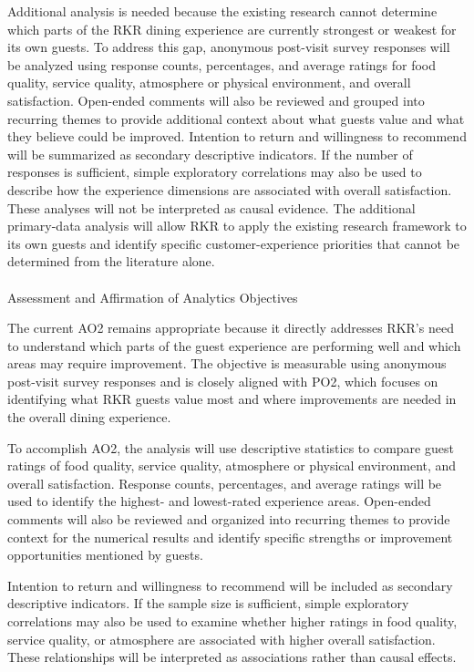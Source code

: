 \documentclass[
  12pt,
  letterpaper,
  DIV=11,
  numbers=noendperiod]{scrartcl}
\makeatletter
\let\oldparagraph\paragraph
\renewcommand{\paragraph}{
    \@ifstar
      \xxxParagraphStar
      \xxxParagraphNoStar
  }
\newcommand{\xxxParagraphStar}[1]{\oldparagraph*{#1}\mbox{}}
\newcommand{\xxxParagraphNoStar}[1]{\oldparagraph{#1}\mbox{}}
\makeatother
\begin{document}
Additional analysis is needed because the existing research cannot
determine which parts of the RKR dining experience are currently
strongest or weakest for its own guests. To address this gap, anonymous
post-visit survey responses will be analyzed using response counts,
percentages, and average ratings for food quality, service quality,
atmosphere or physical environment, and overall satisfaction. Open-ended
comments will also be reviewed and grouped into recurring themes to
provide additional context about what guests value and what they believe
could be improved. Intention to return and willingness to recommend will
be summarized as secondary descriptive indicators. If the number of
responses is sufficient, simple exploratory correlations may also be
used to describe how the experience dimensions are associated with
overall satisfaction. These analyses will not be interpreted as causal
evidence. The additional primary-data analysis will allow RKR to apply
the existing research framework to its own guests and identify specific
customer-experience priorities that cannot be determined from the
literature alone.

\paragraph{Assessment and Affirmation of Analytics
Objectives}\label{assessment-and-affirmation-of-analytics-objectives-1}

The current AO2 remains appropriate because it directly addresses RKR's
need to understand which parts of the guest experience are performing
well and which areas may require improvement. The objective is
measurable using anonymous post-visit survey responses and is closely
aligned with PO2, which focuses on identifying what RKR guests value
most and where improvements are needed in the overall dining experience.

To accomplish AO2, the analysis will use descriptive statistics to
compare guest ratings of food quality, service quality, atmosphere or
physical environment, and overall satisfaction. Response counts,
percentages, and average ratings will be used to identify the highest-
and lowest-rated experience areas. Open-ended comments will also be
reviewed and organized into recurring themes to provide context for the
numerical results and identify specific strengths or improvement
opportunities mentioned by guests.

Intention to return and willingness to recommend will be included as
secondary descriptive indicators. If the sample size is sufficient,
simple exploratory correlations may also be used to examine whether
higher ratings in food quality, service quality, or atmosphere are
associated with higher overall satisfaction. These relationships will be
interpreted as associations rather than causal effects.
\end{document}

